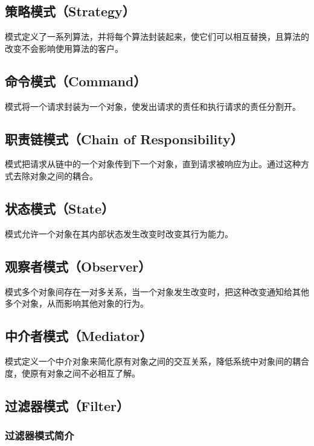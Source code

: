 \documentclass[cn,black,12pt,normal]{elegantnote}
\begin{document}
\subsection{策略模式（Strategy）}

模式定义了一系列算法，并将每个算法封装起来，使它们可以相互替换，且算法的改变不会影响使用算法的客户。

\subsection{命令模式（Command）}

模式将一个请求封装为一个对象，使发出请求的责任和执行请求的责任分割开。

\subsection{职责链模式（Chain of Responsibility）}

模式把请求从链中的一个对象传到下一个对象，直到请求被响应为止。通过这种方式去除对象之间的耦合。

\subsection{状态模式（State）}

模式允许一个对象在其内部状态发生改变时改变其行为能力。

\subsection{观察者模式（Observer）}

模式多个对象间存在一对多关系，当一个对象发生改变时，把这种改变通知给其他多个对象，从而影响其他对象的行为。

\subsection{中介者模式（Mediator）}

模式定义一个中介对象来简化原有对象之间的交互关系，降低系统中对象间的耦合度，使原有对象之间不必相互了解。

\subsection{过滤器模式（Filter）}

\subsubsection{过滤器模式简介}
\end{document}
